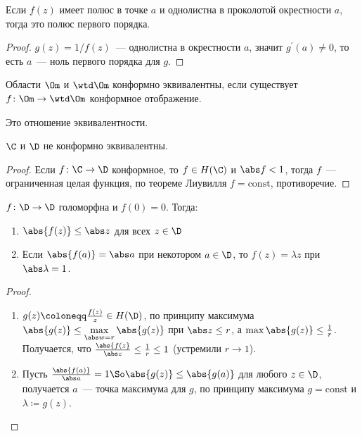 \begin{consequence}
    Если $f(z)$ имеет полюс в точке $a$ и однолистна
    в проколотой окрестности $a$, тогда это полюс первого порядка.
\end{consequence}

\begin{proof}
    $g(z) = 1/f(z)$~--- однолистна в окрестности
    $a$, значит $g^\prime(a) \ne 0$, то есть $a$~--- ноль первого порядка
    для $g$.
\end{proof}

\begin{definition}
    Области $\Om$ и $\wtd\Om$ конформно эквивалентны,
    если существует $f\colon\Om \to \wtd\Om$ конформное отображение.
\end{definition}

\begin{observation}
    Это отношение эквивалентности.
\end{observation}

\begin{theorem}
    $\C$ и $\D$ не конформно эквивалентны.
\end{theorem}

\begin{proof}
    Если $f\colon \C \to \D$ конформное, то $f \in H(\C)$ и $\abs f < 1$,
    тогда $f$~--- ограниченная целая функция, по теореме Лиувилля
    $f = \mathrm{const}$, противоречие.
\end{proof}

\begin{lemma}[Шварц]
    $f\colon \D \to \D$ голоморфна и $f(0) = 0$.
    Тогда:

    \begin{enumerate}
        \item $\abs{f(z)} \le \abs z$ для всех $z \in \D$
        \item Если $\abs{f(a)} = \abs a$ при некотором $a \in \D$, то
              $f(z) = \lambda z$ при $\abs \lambda = 1$.
    \end{enumerate}
\end{lemma}

\begin{proof}\text{}

    \begin{enumerate}
        \item $g(z) \coloneqq \frac{f(z)}{z} \in H(\D)$,
              по принципу максимума $\abs{g(z)} \le \max\limits_{\abs w = r} \abs{g(z)}$
              при $\abs z \le r$, а $\max \abs{g(z)} \le \frac{1}{r}$.
              Получается, что $\frac{\abs{f(z}}{\abs z} \le \frac{1}{r} \le 1$
              (устремили $r \to 1$).

        \item Пусть $\frac{\abs{f(a)}}{\abs a} = 1 \So \abs{g(z)} \le \abs{g(a)}$
              для любого $z \in \D$, получается $a$~--- точка максимума для $g$,
              по принципу максимума $g = \mathrm{const}$ и $\lambda \coloneqq g(z)$.
    \end{enumerate}
\end{proof}

